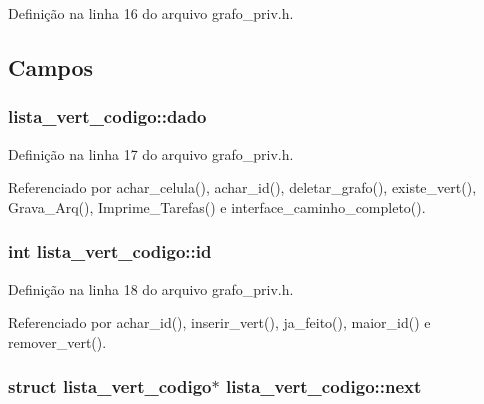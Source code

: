 Definição na linha 16 do arquivo grafo\+\_\+priv.\+h.



\subsection{Campos}
\hypertarget{structlista__vert__codigo_a8e51b3141307b34cb74d6433a136f73b}{}
\subsubsection[{dado}]{ lista\+\_\+vert\+\_\+codigo\+::dado}\label{structlista__vert__codigo_a8e51b3141307b34cb74d6433a136f73b}


Definição na linha 17 do arquivo grafo\+\_\+priv.\+h.



Referenciado por achar\+\_\+celula(), achar\+\_\+id(), deletar\+\_\+grafo(), existe\+\_\+vert(), Grava\+\_\+\+Arq(), Imprime\+\_\+\+Tarefas() e interface\+\_\+caminho\+\_\+completo().

\hypertarget{structlista__vert__codigo_acc7c3bce66ab242ba6e64e763dfb63b3}{}
\subsubsection[{id}]{\setlength{\rightskip}{0pt plus 5cm}int lista\+\_\+vert\+\_\+codigo\+::id}\label{structlista__vert__codigo_acc7c3bce66ab242ba6e64e763dfb63b3}


Definição na linha 18 do arquivo grafo\+\_\+priv.\+h.



Referenciado por achar\+\_\+id(), inserir\+\_\+vert(), ja\+\_\+feito(), maior\+\_\+id() e remover\+\_\+vert().

\hypertarget{structlista__vert__codigo_af1cac7f22cb6142a13bd1f9c41f4c0b5}{}
\subsubsection[{next}]{\setlength{\rightskip}{0pt plus 5cm}struct {\bf lista\+\_\+vert\+\_\+codigo}$\ast$ lista\+\_\+vert\+\_\+codigo\+::next}\label{structlista__vert__codigo_af1cac7f22cb6142a13bd1f9c41f4c0b5}


